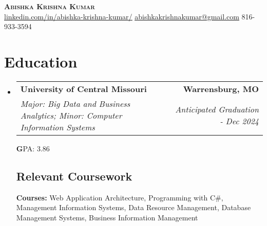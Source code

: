 \documentclass[letterpaper,11pt]{article}
\makeatletter
\newcommand{\resumeSubheading}[4]{
  \vspace{-2pt}\item
    \begin{tabular*}{0.97\textwidth}[t]{l@{\extracolsep{\fill}}r}
      \textbf{#1} & #2 \\
      \textit{\small#3} & \textit{\small #4} \\
    \end{tabular*}\vspace{-2pt}
}
\newcommand{\resumeSubHeadingListStart}{\begin{itemize}[leftmargin=0.15in, label={}]}
\newcommand{\resumeSubHeadingListEnd}{\end{itemize}}
\makeatother
\begin{document}
\begin{flushright}
    \color{gray}
    \item
\end{flushright}

\vspace{-5pt}

\begin{center}
    \textbf{\Huge \scshape Abishka Krishna Kumar} \\ \vspace{8pt}
    \small
    \href{https://www.linkedin.com/in/abishka-krishna-kumar/}{\underline{linkedin.com/in/abishka-krishna-kumar/}}
    \href{mailto:abishkakrishnakumar@gmail.com}
    {\underline{abishkakrishnakumar@gmail.com}}
    816-933-3594\\
\end{center}

\section{Education}
\resumeSubHeadingListStart

\resumeSubheading
{University of Central Missouri}{\bfseries Warrensburg, MO}
{Major: Big Data and Business Analytics; Minor: Computer Information Systems}{Anticipated Graduation - Dec 2024}
{\textbf GPA: 3.86}

\subsection{Relevant Coursework}
\textbf{Courses:} Web Application Architecture, Programming with C\#, Management Information Systems, Data Resource Management, Database Management Systems, Business Information Management

\resumeSubHeadingListEnd

\end{document}
